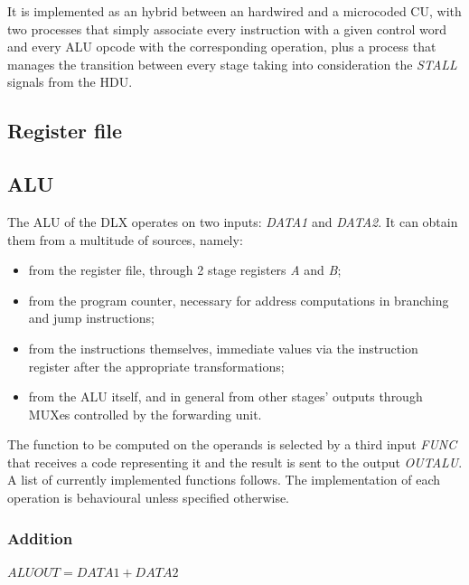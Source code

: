 It is implemented as an hybrid between an hardwired and a microcoded CU, with two processes that simply associate every instruction with a given control word and every ALU opcode with the corresponding operation, plus a process that manages the transition between every stage taking into consideration the \emph{STALL} signals from the HDU.

\subsection{Register file}
\subsection{ALU}
The ALU of the DLX operates on two inputs: \emph{DATA1} and \emph{DATA2}. It can obtain them from a multitude of sources, namely: 
\begin{itemize}
	\item from the register file, through 2 stage registers \emph{A} and \emph{B};
	\item from the program counter, necessary for address computations in branching and jump instructions;
	\item from the instructions themselves, immediate values via the instruction register after the appropriate transformations;
	\item from the ALU itself, and in general from other stages' outputs through MUXes controlled by the forwarding unit.
\end{itemize}


The function to be computed on the operands is selected by a third input \emph{FUNC} that receives a code representing it and the result is sent to the output \emph{OUTALU}. A list of currently implemented functions follows. The implementation of each operation is behavioural unless specified otherwise. 

\subsubsection{Addition}
$ \mathit{ALUOUT} = \mathit{DATA1} + \mathit{DATA2} $

